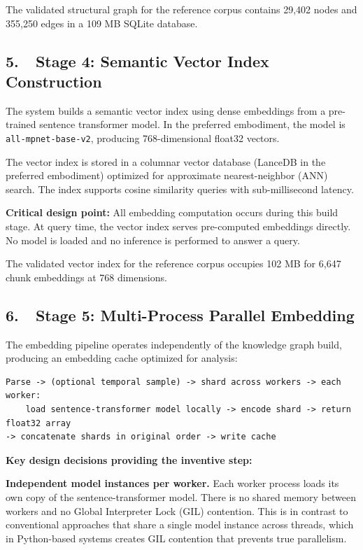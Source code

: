 \documentclass[12pt,letterpaper]{article}
\begin{document}
The validated structural graph for the reference corpus contains 29,402 nodes and
355,250 edges in a 109 MB SQLite database.

\subsection*{5.\ \ Stage 4: Semantic Vector Index Construction}

The system builds a semantic vector index using dense embeddings from a pre-trained
sentence transformer model. In the preferred embodiment, the model is
\texttt{all-mpnet-base-v2}, producing 768-dimensional float32 vectors.

The vector index is stored in a columnar vector database (LanceDB in the preferred
embodiment) optimized for approximate nearest-neighbor (ANN) search. The index supports
cosine similarity queries with sub-millisecond latency.

\textbf{Critical design point:} All embedding computation occurs during this build
stage. At query time, the vector index serves pre-computed embeddings directly. No
model is loaded and no inference is performed to answer a query.

The validated vector index for the reference corpus occupies 102 MB for 6,647 chunk
embeddings at 768 dimensions.

\subsection*{6.\ \ Stage 5: Multi-Process Parallel Embedding}

The embedding pipeline operates independently of the knowledge graph build, producing
an embedding cache optimized for analysis:

\begin{lstlisting}[caption={Multi-process parallel embedding pipeline}]
Parse -> (optional temporal sample) -> shard across workers -> each worker:
    load sentence-transformer model locally -> encode shard -> return float32 array
-> concatenate shards in original order -> write cache
\end{lstlisting}

\textbf{Key design decisions providing the inventive step:}

\textbf{Independent model instances per worker.} Each worker process loads its own copy
of the sentence-transformer model. There is no shared memory between workers and no
Global Interpreter Lock (GIL) contention. This is in contrast to conventional
approaches that share a single model instance across threads, which in Python-based
systems creates GIL contention that prevents true parallelism.
\end{document}
